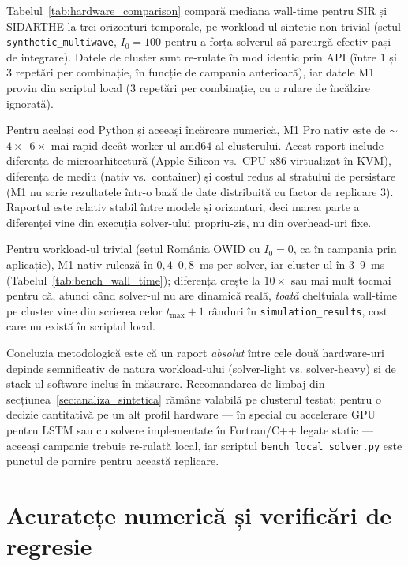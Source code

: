 Tabelul~\ref{tab:hardware_comparison} compară mediana wall-time pentru SIR și
SIDARTHE la trei orizonturi temporale, pe workload-ul sintetic non-trivial
(setul \texttt{synthetic\_multiwave}, $I_0 = 100$ pentru a forța solverul să
parcurgă efectiv pași de integrare). Datele de cluster sunt re-rulate în
mod identic prin API (între $1$ și $3$ repetări per combinație, în funcție
de campania anterioară), iar datele M1 provin din scriptul local
(3 repetări per combinație, cu o rulare de încălzire ignorată).



Pentru același cod Python și aceeași încărcare numerică, M1 Pro nativ
este de $\sim$$4\times$--$6\times$ mai rapid decât worker-ul amd64 al
clusterului. Acest raport include diferența de microarhitectură (Apple
Silicon vs.\ CPU x86 virtualizat în KVM), diferența de mediu (nativ vs.\
container) și costul redus al stratului de persistare (M1 nu scrie
rezultatele într-o bază de date distribuită cu factor de replicare 3).
Raportul este relativ stabil între modele și orizonturi, deci marea parte
a diferenței vine din execuția solver-ului propriu-zis, nu din
overhead-uri fixe.

Pentru workload-ul trivial (setul România OWID cu $I_0 = 0$, ca în
campania prin aplicație), M1 nativ rulează în $0{,}4$--$0{,}8$~ms per
solver, iar cluster-ul în $3$--$9$~ms (Tabelul~\ref{tab:bench_wall_time});
diferența crește la $10\times$ sau mai mult tocmai pentru că, atunci când
solver-ul nu are dinamică reală, \emph{toată} cheltuiala wall-time pe
cluster vine din scrierea celor $t_{\max}+1$ rânduri în
\texttt{simulation\_results}, cost care nu există în scriptul local.

Concluzia metodologică este că un raport \emph{absolut} între cele două
hardware-uri depinde semnificativ de natura workload-ului (solver-light vs.
solver-heavy) și de stack-ul software inclus în măsurare. Recomandarea de
limbaj din secțiunea~\ref{sec:analiza_sintetica} rămâne valabilă pe
clusterul testat; pentru o decizie cantitativă pe un alt profil
hardware --- în special cu accelerare GPU pentru LSTM sau cu solvere
implementate în Fortran/C++ legate static --- aceeași campanie trebuie
re-rulată local, iar scriptul \texttt{bench\_local\_solver.py} este punctul
de pornire pentru această replicare.

\section{Acuratețe numerică și verificări de regresie}
\label{sec:acuratete}

